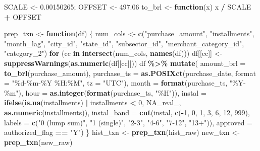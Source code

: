 \documentclass[
]{article}
\newenvironment{Shaded}{\begin{snugshade}}{\end{snugshade}}
\newcommand{\AttributeTok}[1]{\textcolor[rgb]{0.13,0.29,0.53}{#1}}
\newcommand{\ConstantTok}[1]{\textcolor[rgb]{0.56,0.35,0.01}{#1}}
\newcommand{\ControlFlowTok}[1]{\textcolor[rgb]{0.13,0.29,0.53}{\textbf{#1}}}
\newcommand{\DecValTok}[1]{\textcolor[rgb]{0.00,0.00,0.81}{#1}}
\newcommand{\FloatTok}[1]{\textcolor[rgb]{0.00,0.00,0.81}{#1}}
\newcommand{\FunctionTok}[1]{\textcolor[rgb]{0.13,0.29,0.53}{\textbf{#1}}}
\newcommand{\NormalTok}[1]{#1}
\newcommand{\OtherTok}[1]{\textcolor[rgb]{0.56,0.35,0.01}{#1}}
\newcommand{\SpecialCharTok}[1]{\textcolor[rgb]{0.81,0.36,0.00}{\textbf{#1}}}
\newcommand{\StringTok}[1]{\textcolor[rgb]{0.31,0.60,0.02}{#1}}
\begin{document}
\begin{Shaded}
\begin{Highlighting}[]
\NormalTok{SCALE }\OtherTok{\textless{}{-}} \FloatTok{0.00150265}\NormalTok{; OFFSET }\OtherTok{\textless{}{-}} \FloatTok{497.06}
\NormalTok{to\_brl }\OtherTok{\textless{}{-}} \ControlFlowTok{function}\NormalTok{(x) x }\SpecialCharTok{/}\NormalTok{ SCALE }\SpecialCharTok{+}\NormalTok{ OFFSET}

\NormalTok{prep\_txn }\OtherTok{\textless{}{-}} \ControlFlowTok{function}\NormalTok{(df) \{}
\NormalTok{  num\_cols }\OtherTok{\textless{}{-}} \FunctionTok{c}\NormalTok{(}\StringTok{"purchase\_amount"}\NormalTok{, }\StringTok{"installments"}\NormalTok{, }\StringTok{"month\_lag"}\NormalTok{, }\StringTok{"city\_id"}\NormalTok{,}
                \StringTok{"state\_id"}\NormalTok{, }\StringTok{"subsector\_id"}\NormalTok{, }\StringTok{"merchant\_category\_id"}\NormalTok{, }\StringTok{"category\_2"}\NormalTok{)}
  \ControlFlowTok{for}\NormalTok{ (cc }\ControlFlowTok{in} \FunctionTok{intersect}\NormalTok{(num\_cols, }\FunctionTok{names}\NormalTok{(df)))}
\NormalTok{    df[[cc]] }\OtherTok{\textless{}{-}} \FunctionTok{suppressWarnings}\NormalTok{(}\FunctionTok{as.numeric}\NormalTok{(df[[cc]]))}
\NormalTok{  df }\SpecialCharTok{\%\textgreater{}\%} \FunctionTok{mutate}\NormalTok{(}
    \AttributeTok{amount\_brl  =} \FunctionTok{to\_brl}\NormalTok{(purchase\_amount),}
    \AttributeTok{purchase\_ts =} \FunctionTok{as.POSIXct}\NormalTok{(purchase\_date, }\AttributeTok{format =} \StringTok{"\%d{-}\%m{-}\%Y \%H:\%M"}\NormalTok{, }\AttributeTok{tz =} \StringTok{"UTC"}\NormalTok{),}
    \AttributeTok{month       =} \FunctionTok{format}\NormalTok{(purchase\_ts, }\StringTok{"\%Y{-}\%m"}\NormalTok{),}
    \AttributeTok{hour        =} \FunctionTok{as.integer}\NormalTok{(}\FunctionTok{format}\NormalTok{(purchase\_ts, }\StringTok{"\%H"}\NormalTok{)),}
    \AttributeTok{instal      =} \FunctionTok{ifelse}\NormalTok{(}\FunctionTok{is.na}\NormalTok{(installments) }\SpecialCharTok{|}\NormalTok{ installments }\SpecialCharTok{\textless{}} \DecValTok{0}\NormalTok{, }\ConstantTok{NA\_real\_}\NormalTok{,}
                         \FunctionTok{as.numeric}\NormalTok{(installments)),}
    \AttributeTok{instal\_band =} \FunctionTok{cut}\NormalTok{(instal, }\FunctionTok{c}\NormalTok{(}\SpecialCharTok{{-}}\DecValTok{1}\NormalTok{, }\DecValTok{0}\NormalTok{, }\DecValTok{1}\NormalTok{, }\DecValTok{3}\NormalTok{, }\DecValTok{6}\NormalTok{, }\DecValTok{12}\NormalTok{, }\DecValTok{999}\NormalTok{),}
                      \AttributeTok{labels =} \FunctionTok{c}\NormalTok{(}\StringTok{"0 (lump sum)"}\NormalTok{, }\StringTok{"1 (single)"}\NormalTok{, }\StringTok{"2{-}3"}\NormalTok{, }\StringTok{"4{-}6"}\NormalTok{, }\StringTok{"7{-}12"}\NormalTok{, }\StringTok{"13+"}\NormalTok{)),}
    \AttributeTok{approved    =}\NormalTok{ authorized\_flag }\SpecialCharTok{==} \StringTok{"Y"}\NormalTok{)}
\NormalTok{\}}
\NormalTok{hist\_txn }\OtherTok{\textless{}{-}} \FunctionTok{prep\_txn}\NormalTok{(hist\_raw)}
\NormalTok{new\_txn  }\OtherTok{\textless{}{-}} \FunctionTok{prep\_txn}\NormalTok{(new\_raw)}


\end{Highlighting}
\end{Shaded}
\end{document}
